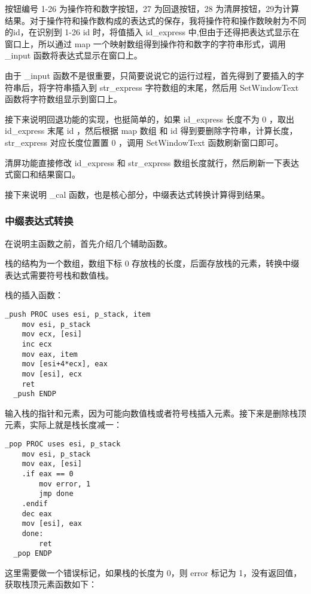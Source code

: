 \documentclass[proposal-report]{bitart}
\begin{document}
按钮编号 1-26 为操作符和数字按钮，27 为回退按钮，28 为清屏按钮，29为计算结果。对于操作符和操作数构成的表达式的保存，我将操作符和操作数映射为不同的id，在识别到 1-26 id 时，将值插入 id\_express 中,但由于还得把表达式显示在窗口上，所以通过 map 一个映射数组得到操作符和数字的字符串形式，调用 \_input 函数将表达式显示在窗口上。

由于 \_input 函数不是很重要，只简要说说它的运行过程，首先得到了要插入的字符串后，将字符串插入到 str\_express 字符数组的末尾，然后用 SetWindowText 函数将字符数组显示到窗口上。

接下来说明回退功能的实现，也挺简单的，如果 id\_express 长度不为 0 ，取出 id\_express 末尾 id ，然后根据 map 数组 和 id 得到要删除字符串，计算长度， str\_express 对应长度位置置 0 ，调用 SetWindowText 函数刷新窗口即可。

清屏功能直接修改 id\_express 和 str\_express 数组长度就行，然后刷新一下表达式窗口和结果窗口。

接下来说明 \_cal 函数，也是核心部分，中缀表达式转换计算得到结果。

\subsubsection{中缀表达式转换}

在说明主函数之前，首先介绍几个辅助函数。

栈的结构为一个数组，数组下标 0 存放栈的长度，后面存放栈的元素，转换中缀表达式需要符号栈和数值栈。

栈的插入函数：

\begin{lstlisting}[language={[x86masm]Assembler}]
  _push PROC uses esi, p_stack, item 
    mov esi, p_stack
    mov ecx, [esi]
    inc ecx
    mov eax, item
    mov [esi+4*ecx], eax
    mov [esi], ecx
    ret
  _push ENDP
\end{lstlisting}

输入栈的指针和元素，因为可能向数值栈或者符号栈插入元素。接下来是删除栈顶元素，实际上就是栈长度减一：

\begin{lstlisting}[language={[x86masm]Assembler}]
  _pop PROC uses esi, p_stack
    mov esi, p_stack
    mov eax, [esi]
    .if eax == 0
        mov error, 1
        jmp done
    .endif
    dec eax
    mov [esi], eax
    done:
        ret
  _pop ENDP
\end{lstlisting}

这里需要做一个错误标记，如果栈的长度为 0，则 error 标记为 1，没有返回值，获取栈顶元素函数如下：
\end{document}

